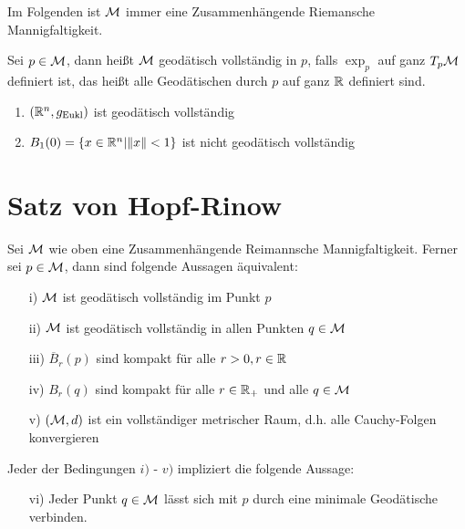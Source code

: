 
Im Folgenden ist $\mathcal{M}$ immer eine Zusammenhängende Riemansche Mannigfaltigkeit.

\begin{defs}
    Sei $p \in \mathcal{M}$, dann heißt $\mathcal{M}$ geodätisch vollständig in $p$, 
    falls $\exp_p$ auf ganz $T_p \mathcal{M}$ definiert ist,
    das heißt alle Geodätischen durch $p$ auf ganz $\mathbb{R}$ definiert sind.
\end{defs}

\begin{bsp}
    \label{bsp:geodvollstaendig}
    \begin{enumerate}
        \item $(\mathbb{R}^n, g_{\text{Eukl}})$ ist geodätisch vollständig
        \item $B_1 (0) = \{ x \in \mathbb{R}^n \vert \norm{x} < 1 \}$ ist nicht geodätisch vollständig
    \end{enumerate}
\end{bsp}



\section{Satz von Hopf-Rinow}

\begin{satz}
    \label{satz:hopfrinow}   
    Sei $\mathcal{M}$ wie oben eine Zusammenhängende Reimannsche Mannigfaltigkeit. 
    Ferner sei $p \in \mathcal{M}$, dann sind folgende Aussagen äquivalent:
    \begin{itemize}
    \item[i)] $\mathcal{M}$ ist geodätisch vollständig im Punkt $p$
    \item[ii)] $\mathcal{M}$ ist geodätisch vollständig in allen Punkten $q \in \mathcal{M}$
    \item[iii)] $\overline{B}_r (p)$ sind kompakt für alle $r > 0, r \in \mathbb{R}$
    \item[iv)] $B_r (q)$  sind kompakt für alle $r \in \mathbb{R}_+$ und alle $ q \in \mathcal{M}$
    \item[v)] $(\mathcal{M}, d)$ ist ein vollständiger metrischer Raum, 
    d.h. alle Cauchy-Folgen konvergieren
    \end{itemize}
    Jeder der Bedingungen $i)$ - $v)$ impliziert die folgende Aussage:
    \begin{itemize}
    \item[vi)] Jeder Punkt $q \in \mathcal{M}$ lässt sich mit $p$ durch eine 
    minimale Geodätische verbinden.
    \end{itemize}
\end{satz}

